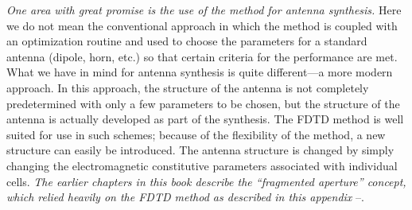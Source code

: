 \emph{One area with great promise is the use of the method for antenna synthesis.}  Here we do not mean the conventional approach in which the method is coupled with an optimization routine and used to choose the parameters for a standard antenna (dipole, horn, etc.) so that certain criteria for the performance are met.  What we have in mind for antenna synthesis is quite different---a more modern approach.  In this approach, the structure of the antenna is not completely predetermined with only a few parameters to be chosen, but the structure of the antenna is actually developed as part of the synthesis.  The FDTD method is well suited for use in such schemes; because of the flexibility of the method, a new structure can easily be introduced.  The antenna structure is changed by simply changing the electromagnetic constitutive parameters associated with individual cells.  \emph{The earlier chapters in this book describe the ``fragmented aperture'' concept, which relied heavily on the FDTD method as described in this appendix} \cite{MaloneyURSI99}--\cite{RECAP}.

